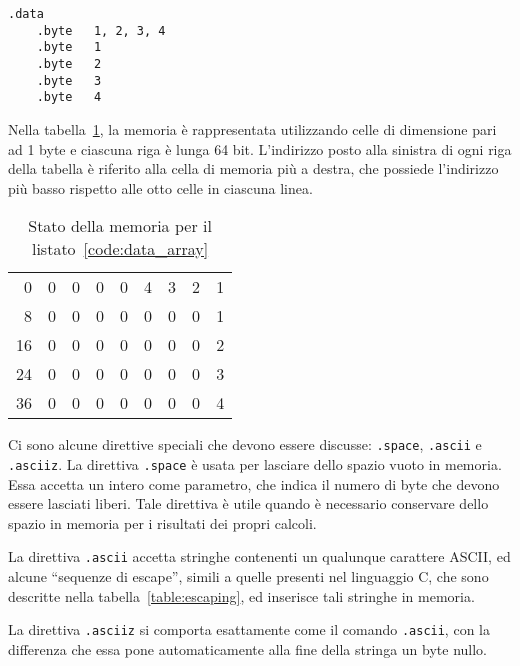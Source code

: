 \documentclass[12pt]{report}
\begin{document}
\begin{lstlisting}[caption={Byte adiacenti}, label={code:data_array}, style={mips}]
	.data
	.byte	1, 2, 3, 4
	.byte	1
	.byte	2
	.byte	3
	.byte	4
\end{lstlisting}

Nella tabella~\ref{table:effect}, la memoria \`{e} rappresentata utilizzando celle di dimensione pari 
ad 1 byte e ciascuna riga \`{e} lunga 64 bit. L'indirizzo posto alla sinistra di ogni riga della tabella \`{e} 
riferito alla cella di memoria pi\`{u} a destra, che possiede l'indirizzo pi\`{u} basso rispetto alle otto celle in ciascuna linea.

\begin{table}[htb]
	\begin{centering}
		\begin{tabular}{r|c|c|c|c|c|c|c|c|}
			\cline{2-9}
			0 & 0 & 0 & 0 & 0 &4 & 3 &2 &1 \\
			\cline{2-9}
			8 & 0 & 0 & 0 & 0 &0 & 0 &0 &1 \\
			\cline{2-9}
			16 & 0 & 0 & 0 & 0 &0 & 0 &0 &2 \\
			\cline{2-9}
			24 & 0 & 0 & 0 & 0 &0 & 0 &0 &3 \\
			\cline{2-9}
			36 & 0 & 0 & 0 & 0 &0 & 0 &0 &4\\ 
			\cline{2-9}
		\end{tabular}
		\caption{Stato della memoria per il listato~\ref{code:data_array}}
		\label{table:effect}
	\end{centering}
\end{table}
Ci sono alcune direttive speciali che devono essere discusse: \texttt{.space}, 
\texttt{.ascii} e \texttt{.asciiz}.
La direttiva \texttt{.space} \`{e} usata per lasciare dello spazio vuoto in memoria. 
Essa accetta un intero come parametro, che indica il numero di byte che devono essere lasciati liberi. 
Tale direttiva \`{e} utile quando \`{e} necessario conservare dello spazio in memoria per i risultati dei propri calcoli.

La direttiva \texttt{.ascii} accetta stringhe contenenti un qualunque carattere ASCII, 
ed alcune ``sequenze di escape'', simili a quelle presenti nel linguaggio C, che sono descritte nella 
tabella~\ref{table:escaping}, ed inserisce tali stringhe in memoria.

La direttiva \texttt{.asciiz} si comporta esattamente come il comando \texttt{.ascii},
con la differenza che essa pone automaticamente alla fine della stringa un byte nullo.
\end{document}

